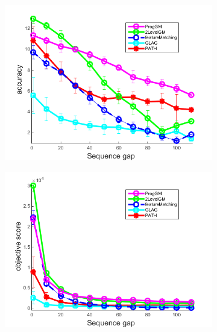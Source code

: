 \begin{figure}[h] \centering
		\begin{subfigure}[b]{0.33\textwidth}
			\centering
			\includegraphics[scale=0.25]{"chapter3/fig/HouseSeq2/anchor_descr/using_cpd_afftrafo/solution2/performance/accuracy"} 
		\end{subfigure} 
		\begin{subfigure}[b]{0.33\textwidth}
			\centering
			\includegraphics[scale=0.25]{"chapter3/fig/HouseSeq2/anchor_descr/using_cpd_afftrafo/solution2/performance/score"} 
		\end{subfigure}
		\begin{subfigure}[b]{0.32\textwidth}
			\centering

\end{subfigure}
\end{figure}
